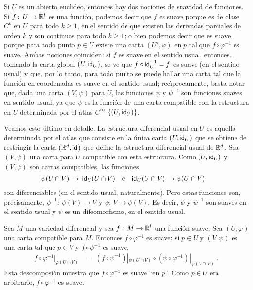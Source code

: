 Si $U$ es un abierto euclideo, entonces hay dos nociones de suavidad de
funciones. Si $f:\,U\rightarrow\bb{R}^{l}$ es una funci\'{o}n, podemos
decir que $f$ es suave porque es de clase $C^{k}$ en $U$ para todo $k\geq 1$,
en el sentido de que existen las derivadas parciales de orden $k$ y son
continuas para todo $k\geq 1$; o bien podemos decir que es suave porque
para todo punto $p\in U$ existe una carta $(U',\varphi)$ en $p$ tal que
$f\circ\varphi^{-1}$ es suave. Ambas nociones coinciden: si $f$ es suave en
el sentido usual, entonces, tomando la carta global $(U,\id[U])$, se ve
que $f\circ\id[U]^{-1}=f$ es suave (en el sentido usual) y que, por lo
tanto, para todo punto se puede hallar una carta tal que la funci\'{o}n
en coordenadas es suave en el sentido usual; rec\'{\i}procamente, basta
notar que, dada una carta $(V,\psi)$ para $U$, las funciones $\psi$ y
$\psi^{-1}$ son funciones suaves en sentido usual, ya que $\psi$ es la
funci\'{o}n de una carta compatible con la estructura en $U$ determinada
por el atlas $C^{\infty}$ $\{(U,\id[U])\}$.

\begin{obsComoLaUsual}\label{obs:comolausual}
Veamos esto \'{u}ltimo en detalle. La estructura diferencial usual en
$U$ es aquella determinada por el atlas que consiste en la \'{u}nica
carta $(U,\id[U])$ que se obtiene de restringir la carta $(\bb{R}^{d},\id)$
que define la estructura diferencial usual de $\bb{R}^{d}$. Sea $(V,\psi)$
una carta para $U$ compatible con esta estructura. Como $(U,\id[U])$ y
$(V,\psi)$ son cartas compatibles, las funciones
\begin{align*}
	\psi(U\cap V)\,\rightarrow\,\id[U](U\cap V) &
	\quad\text{e}\quad
	\id[U](U\cap V)\,\rightarrow\psi(U\cap V)
\end{align*}
%
son diferenciables (en el sentido usual, naturalmente). Pero estas funciones
son, precisamente, $\psi^{-1}:\,\psi(V)\rightarrow V$ y
$\psi:\,V\rightarrow\psi(V)$. Es decir, $\psi$ y $\psi^{-1}$ son suaves
en el sentido usual y $\psi$ es un difeomorfismo, en el sentido usual.
\end{obsComoLaUsual}

\begin{obsTodasSonSuaves}\label{obs:todassonsuaves}
Sea $M$ una variedad diferencial y sea $f:\,M\rightarrow\bb{R}^{l}$ una
funci\'{o}n suave. Sea $(U,\varphi)$ una carta compatible para $M$. Entonces
$f\circ\varphi^{-1}$ es suave: si $p\in U$ y $(V,\psi)$ es una carta tal
que $p\in V$ y $f\circ\psi^{-1}$ es suave,
\begin{align*}
	f\circ\varphi^{-1}|_{\varphi(U\cap V)} & \,=\,
	(f\circ\psi^{-1})|_{\psi(U\cap V)}\circ
		(\psi\circ\varphi^{-1})|_{\varphi(U\cap V)}
	\text{ .}
\end{align*}
%
Esta descomposi\'{o}n muestra que $f\circ\varphi^{-1}$ es suave ``en $p$''.
Como $p\in U$ era arbitrario, $f\circ\varphi^{-1}$ es suave.
\end{obsTodasSonSuaves}

